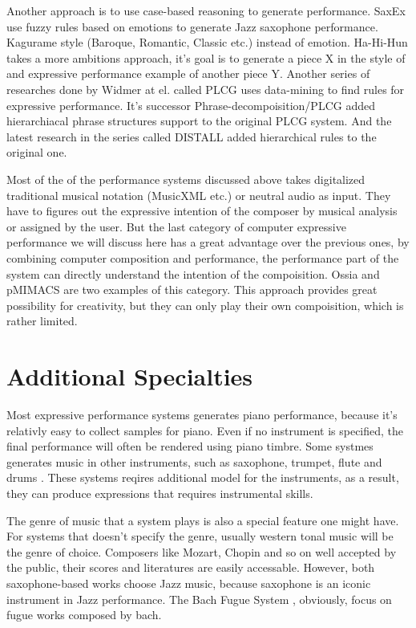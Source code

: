 Another approach is to use case-based reasoning to generate performance. SaxEx\cite{40,41,42} use fuzzy rules based on emotions to generate Jazz saxophone performance. Kagurame \cite{43,44} style (Baroque, Romantic, Classic etc.) instead of emotion. Ha-Hi-Hun \cite{45} takes a more ambitions approach, it's goal is to generate a piece X in the style of and expressive performance example of another piece Y. Another series of researches done by Widmer at el. called PLCG \cite{46, 47, 48} uses data-mining to find rules for expressive performance. It's successor Phrase-decompoisition/PLCG \cite{49} added hierarchiacal phrase structures support to the original PLCG system. And the latest research in the series called DISTALL \cite{50, 51} added hierarchical rules to the original one.

Most of the of the performance systems discussed above takes digitalized traditional musical notation (MusicXML etc.) or neutral audio as input. They have to figures out the expressive intention of the composer by musical analysis or assigned by the user. But the last category of computer expressive performance we will discuss here has a great advantage over the previous ones, by combining computer composition and performance, the performance part of the system can directly understand the intention of the compoisition. Ossia \cite{61} and pMIMACS \cite{pmimacs} are two examples of this category.
   This approach provides great possibility for creativity, but they can only play their own compoisition, which is rather limited.

\section{Additional Specialties}

Most expressive performance systems generates piano performance, because it's relativly easy to collect samples for piano. Even if no instrument is specified, the final performance will often be rendered using piano timbre. Some systmes generates music in other instruments, such as saxophone\cite{40, 41, 42}, trumpet\cite{24, 25}, flute \cite{39} and drums \cite{56}. These systems reqires additional model for the instruments, as a result, they can produce expressions that requires instrumental skills.

The genre of music that a system plays is also a special feature one might have. For systems that doesn't specify the genre, usually western tonal music will be the genre of choice. Composers like Mozart, Chopin and so on well accepted by the public, their scores and literatures are easily accessable. However, both saxophone-based works choose Jazz music, because saxophone is an iconic instrument in Jazz performance. The Bach Fugue System \cite{23}, obviously, focus on fugue works composed by bach.


